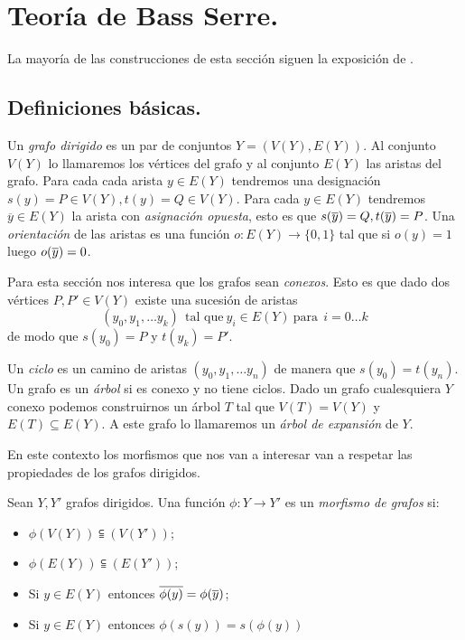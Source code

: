 \documentclass[tesis.tex]{subfiles}
\begin{document}
\section{Teoría de Bass Serre.}

La mayoría de las construcciones de esta sección siguen la exposición de \cite{serre2002trees}.

\subsection{Definiciones básicas.}

	Un \emph{grafo dirigido} es un par de conjuntos $Y= (V(Y),E(Y))$. 
 	Al conjunto $V(Y)$ lo llamaremos los vértices del grafo y al conjunto $E(Y)$ las aristas del grafo.
	Para cada cada arista $y \in E(Y)$ tendremos una designación $s(y) = P \in V(Y), t(y) = Q \in V(Y)$.
	Para cada $y \in E(Y)$ tendremos $\overline y \in E(Y)$ la arista con \emph{asignación opuesta}, esto es que $s(\overline y) = Q, t(\overline y) = P$. 
	Una \emph{orientación} de las aristas es una función $o:E(Y) \to \{ 0 ,1 \}$ tal que si $o(y)=1$ luego $o(\overline y)= 0$.
	
	Para esta sección nos interesa que los grafos sean \emph{conexos}. 
	Esto es que dado dos vértices $P,P' \in V(Y)$ existe una sucesión de aristas
	\[
		(y_0, y_1, \dots y_k) \ \ \text{tal que} \ y_i \in E(Y)  \ \text{para} \ \ i = 0 \dots k
	\]
	de modo que $s(y_0) = P $ y $t (y_k) = P'$.
	
	
	Un \emph{ciclo} es un camino de aristas $(y_0, y_1, \dots y_n)$ de manera que $s(y_0) = t(y_n)$. 
	Un grafo es un \emph{árbol} si es conexo y no tiene ciclos.
	Dado un grafo cualesquiera $Y$ conexo podemos construirnos un árbol $T$ tal que $V(T) = V(Y)$ y $E(T) \subseteq E(Y)$. 
	A este grafo lo llamaremos un \emph{árbol de expansión} de $Y$.
	
 	
	En este contexto los morfismos que nos van a interesar van a respetar las propiedades de los grafos dirigidos.

\begin{deff}
	Sean $Y, Y'$ grafos dirigidos. 
	Una función $\phi:Y \to Y'  $ es un \emph{morfismo de grafos} si:
	\begin{itemize}
		\item $\phi (V(Y)) \subseteqq  (V(Y'))$;
		\item $\phi (E(Y)) \subseteqq  (E(Y'))$;
		\item Si $y \in E(Y)$ entonces $\overline{\phi(y)} = \phi(\overline y)$;
		\item Si $y \in E(Y)$ entonces $\phi(s(y)) = s(\phi(y))$
	\end{itemize}   
\end{deff}
\end{document}
